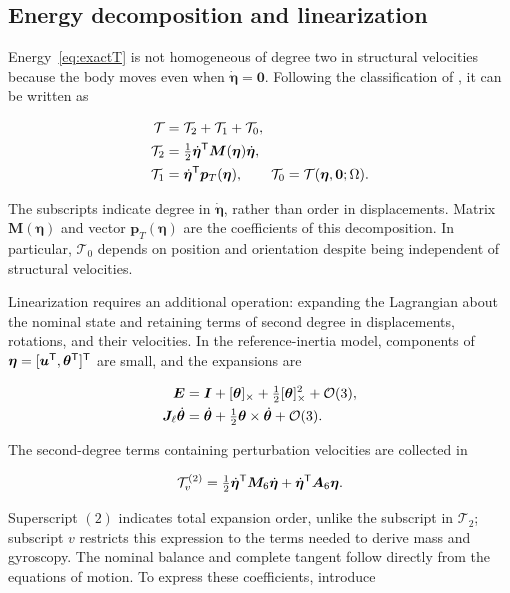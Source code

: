\subsection{Energy decomposition and linearization}
Energy~\eqref{eq:exactT} is not homogeneous of degree two in structural velocities because the body moves even when $\dot{\bm\eta}=\bm0$. Following the classification of \citet[Sections 4.1 and 4.4]{meirovitch1997}, it can be written as

\begin{align}
\mathcal T&=\mathcal T_2+\mathcal T_1+\mathcal T_0,\nonumber\\
\mathcal T_2&=\tfrac12\dot{\bm\eta}^\mathsf T\bm M(\bm\eta)\dot{\bm\eta},\nonumber\\
\mathcal T_1&=\dot{\bm\eta}^\mathsf T\bm p_T(\bm\eta),\qquad
\mathcal T_0=\mathcal T(\bm\eta,\bm0;\Omega).
\label{eq:descomposicion}
\end{align}

The subscripts indicate degree in $\dot{\bm\eta}$, rather than order in displacements. Matrix $\bm M(\bm\eta)$ and vector $\bm p_T(\bm\eta)$ are the coefficients of this decomposition. In particular, $\mathcal T_0$ depends on position and orientation despite being independent of structural velocities.

Linearization requires an additional operation: expanding the Lagrangian about the nominal state and retaining terms of second degree in displacements, rotations, and their velocities. In the reference-inertia model, components of $\bm\eta=[\bm u^\mathsf T,\bm\theta^\mathsf T]^\mathsf T$ are small, and the expansions are

\begin{align}
\bm E&=\bm I+[\bm{\theta}]_\times+\tfrac12[\bm{\theta}]_\times^2+\mathcal O(3),\nonumber\\
\bm J_\ell\dot{\bm\theta}&=\dot{\bm\theta}
+\tfrac12\bm\theta\times\dot{\bm\theta}+\mathcal O(3).
\end{align}

The second-degree terms containing perturbation velocities are collected in

\begin{equation}
\mathcal T_v^{(2)}=\tfrac12\dot{\bm\eta}^\mathsf T\bm M_6\dot{\bm\eta}
+\dot{\bm\eta}^\mathsf T\bm A_6\bm\eta.
\label{eq:T2}
\end{equation}

Superscript $(2)$ indicates total expansion order, unlike the subscript in $\mathcal T_2$; subscript $v$ restricts this expression to the terms needed to derive mass and gyroscopy. The nominal balance and complete tangent follow directly from the equations of motion. To express these coefficients, introduce

